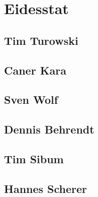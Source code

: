 



\tableofcontents

\newpage

\section{Eidesstat}
\subsection{Tim Turowski}

\newpage
\subsection{Caner Kara}

\newpage
\subsection{Sven Wolf}

\newpage
\subsection{Dennis Behrendt}

\newpage
\subsection{Tim Sibum}

\newpage
\subsection{Hannes Scherer}



